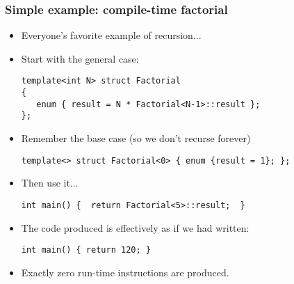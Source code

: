 \begin{frame}[fragile,t]
\frametitle{Simple example: compile-time factorial}
\begin{itemize}[<+->]
\item Everyone's favorite example of recursion...
\item Start with the general case:
{\scriptsize\begin{verbatim}
template<int N> struct Factorial
{
   enum { result = N * Factorial<N-1>::result };
};

\end{verbatim}
}
\item Remember the base case (so we don't recurse forever)
{\scriptsize\begin{verbatim}
template<> struct Factorial<0> { enum {result = 1}; };

\end{verbatim}
} 
\item Then use it...
{\scriptsize\begin{verbatim}
int main() {  return Factorial<5>::result;  }

\end{verbatim}
}

\item The code produced is effectively as if we had written:
{\scriptsize\begin{verbatim}
int main() { return 120; }

\end{verbatim}
}

\item Exactly zero run-time instructions are produced.


\end{itemize}
\end{frame}


